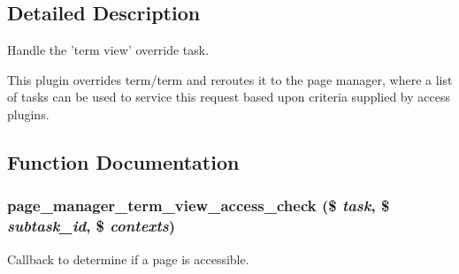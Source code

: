 \subsection{Detailed Description}
Handle the 'term view' override task.

This plugin overrides term/term and reroutes it to the page manager, where a list of tasks can be used to service this request based upon criteria supplied by access plugins. 

\subsection{Function Documentation}
\hypertarget{term__view_8inc_a9ca0ff60d7d47f4dc9fbfa554948d7b1}{
\subsubsection[{page\_\-manager\_\-term\_\-view\_\-access\_\-check}]{\setlength{\rightskip}{0pt plus 5cm}page\_\-manager\_\-term\_\-view\_\-access\_\-check (\$ {\em task}, \/  \$ {\em subtask\_\-id}, \/  \$ {\em contexts})}}
\label{term__view_8inc_a9ca0ff60d7d47f4dc9fbfa554948d7b1}
Callback to determine if a page is accessible.


